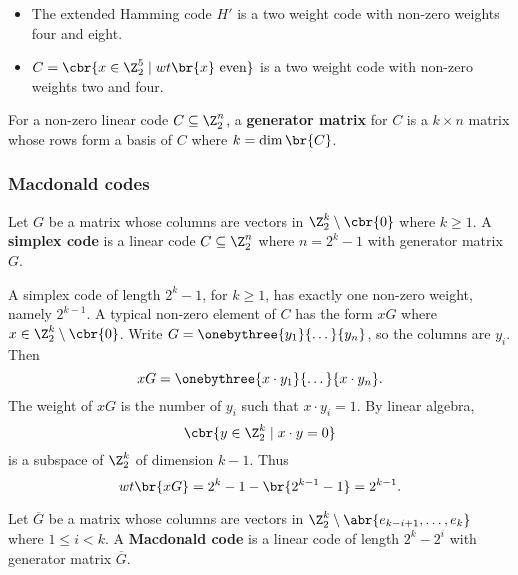 \begin{example*}
\hfill
\begin{itemize}
\item The extended Hamming code $ H' $ is a two weight code with non-zero weights four and eight.
\item $ C = \cbr{x \in \Z_2^5 \mid wt\br{x} \ \text{even}} $ is a two weight code with non-zero weights two and four.
\end{itemize}
\end{example*}

\begin{definition*}
For a non-zero linear code $ C \subseteq \Z_2^n $, a \textbf{generator matrix} for $ C $ is a $ k \times n $ matrix whose rows form a basis of $ C $ where $ k = \dim\br{C} $.
\end{definition*}

\subsubsection{Macdonald codes}

\begin{definition*}
Let $ G $ be a matrix whose columns are vectors in $ \Z_2^k \setminus \cbr{0} $ where $ k \ge 1 $. A \textbf{simplex code} is a linear code $ C \subseteq \Z_2^n $ where $ n = 2^k - 1 $ with generator matrix $ G $.
\end{definition*}

\begin{fact*}
A simplex code of length $ 2^k - 1 $, for $ k \ge 1 $, has exactly one non-zero weight, namely $ 2^{k - 1} $. A typical non-zero element of $ C $ has the form $ xG $ where $ x \in \Z_2^k \setminus \cbr{0} $. Write $ G = \onebythree{y_1}{\dots}{y_n} $, so the columns are $ y_i $. Then
$$ xG = \onebythree{x \cdot y_1}{\dots}{x \cdot y_n}. $$
The weight of $ xG $ is the number of $ y_i $ such that $ x \cdot y_i = 1 $. By linear algebra,
$$ \cbr{y \in \Z_2^k \mid x \cdot y = 0} $$
is a subspace of $ \Z_2^k $ of dimension $ k - 1 $. Thus
$$ wt\br{xG} = 2^k - 1 - \br{2^{k - 1} - 1} = 2^{k - 1}. $$
\end{fact*}

\begin{definition*}
Let $ \overline{G} $ be a matrix whose columns are vectors in $ \Z_2^k \setminus \abr{e_{k - i + 1}, \dots, e_k} $ where $ 1 \le i < k $. A \textbf{Macdonald code} is a linear code of length $ 2^k - 2^i $ with generator matrix $ \overline{G} $.
\end{definition*}

